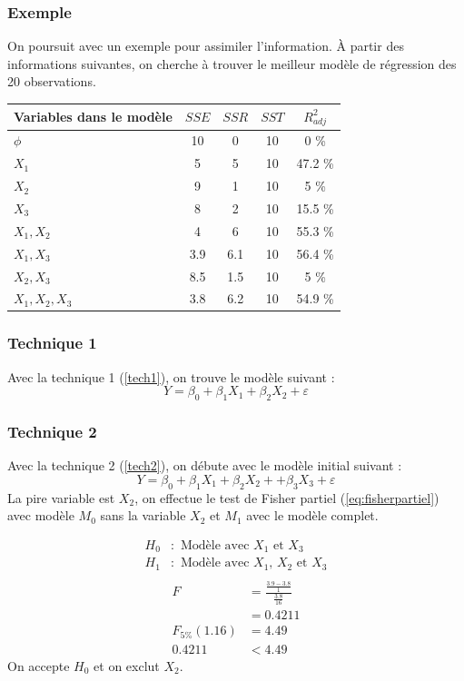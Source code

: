 \documentclass[11pt,french]{report}
\begin{document}
\bigskip
\subsubsection*{Exemple}
On poursuit avec un exemple pour assimiler l'information. \newline
À partir des informations suivantes, on cherche à trouver le meilleur modèle de régression des 20 observations.
\bigskip

\begin{tabularx}{\linewidth}{|X|c|c|c|c|}
\hline
Variables dans le modèle & $SSE$ & $SSR$ & $SST$ & $R^2_{adj}$ \\
\hline
$\phi$ & 10 & 0 & 10 & 0 \% \\
$X_1$ & 5 & 5 & 10 & 47.2 \% \\
$X_2$ & 9 & 1 & 10 & 5 \% \\
$X_3$ & 8 & 2 & 10 & 15.5 \% \\
$X_1, X_2$ & 4 & 6 & 10 & 55.3 \% \\
$X_1, X_3$ & 3.9 & 6.1 & 10 & 56.4 \% \\
$X_2, X_3$ & 8.5 & 1.5 & 10 & 5 \% \\
$X_1, X_2, X_3$ & 3.8 & 6.2 & 10 & 54.9 \% \\
\hline
\end{tabularx}

\subsubsection*{Technique 1}
Avec la technique 1 (\ref{tech1}), on trouve le modèle suivant :
$$
Y = \beta_0 + \beta_1X_1 + \beta_2X_2 + \varepsilon
$$

\subsubsection*{Technique 2}
Avec la technique 2 (\ref{tech2}), on débute avec le modèle initial suivant :
$$
Y = \beta_0 + \beta_1X_1 + \beta_2X_2 + + \beta_3X_3 + \varepsilon
$$
La pire variable est $X_2$, on effectue le test de Fisher partiel (\ref{eq:fisherpartiel}) avec modèle $M_0$ sans la variable $X_2$ et $M_1$ avec le modèle complet. 

\begin{align*}
H_0 &: \text{ Modèle avec $X_1$ et $X_3$} \\
H_1 &: \text{ Modèle avec $X_1$, $X_2$ et $X_3$} \\
\end{align*}
\begin{align*}
F &= \frac{\frac{3.9-3.8}{1}}{\frac{3.8}{16}} \\
&= 0.4211 \\
F_{5 \%}(1.16) &= 4.49 \\
0.4211 &< 4.49
\end{align*}
On accepte $H_0$ et on exclut $X_2$. \newline
\end{document}
